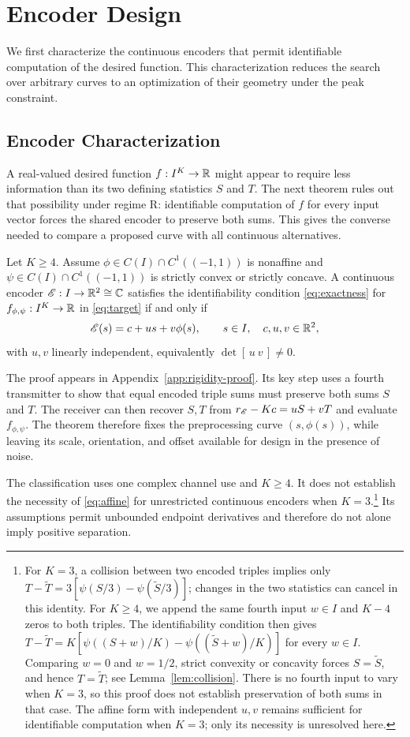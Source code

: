 \section{Encoder Design}\label{sec:design}
We first characterize the continuous encoders that permit identifiable computation of the desired function. This characterization reduces the search over arbitrary curves to an optimization of their geometry under the peak constraint.

\subsection{Encoder Characterization}\label{sec:rigidity}
A real-valued desired function $f:I^K\to\mathbb R$ might appear to require less information than its two defining statistics $S$ and $T$. The next theorem rules out that possibility under regime R: identifiable computation of $f$ for every input vector forces the shared encoder to preserve both sums. This gives the converse needed to compare a proposed curve with all continuous alternatives.

\begin{theorem}
\label{thm:rigidity}
Let $K\ge4$. Assume $\phi\in C(I)\cap C^1((-1,1))$ is nonaffine and $\psi\in C(I)\cap C^1((-1,1))$ is strictly convex or strictly concave. A continuous encoder $\mathscr E:I\to\mathbb R^2\cong\mathbb C$ satisfies the identifiability condition \eqref{eq:exactness} for $f_{\phi,\psi}:I^K\to\mathbb R$ in \eqref{eq:target} if and only if
\begin{equation}
 \mathscr E(s)=c+u s+v\phi(s),
 \qquad s\in I,\quad c,u,v\in\mathbb R^2,
 \label{eq:affine}
\end{equation}
with $u,v$ linearly independent, equivalently $\det[\,u\ v\,]\ne0$.
\end{theorem}
The proof appears in Appendix~\ref{app:rigidity-proof}. Its key step uses a fourth transmitter to show that equal encoded triple sums must preserve both sums $S$ and $T$. The receiver can then recover $S,T$ from $r_\mathscr E-Kc=uS+vT$ and evaluate $f_{\phi,\psi}$. The theorem therefore fixes the preprocessing curve $(s,\phi(s))$, while leaving its scale, orientation, and offset available for design in the presence of noise.

The classification uses one complex channel use and $K\ge4$. It does not establish the necessity of \eqref{eq:affine} for unrestricted continuous encoders when $K=3$.\footnote{For $K=3$, a collision between two encoded triples implies only $T-\widetilde T=3[\psi(S/3)-\psi(\widetilde S/3)]$; changes in the two statistics can cancel in this identity. For $K\ge4$, we append the same fourth input $w\in I$ and $K-4$ zeros to both triples. The identifiability condition then gives $T-\widetilde T=K[\psi((S+w)/K)-\psi((\widetilde S+w)/K)]$ for every $w\in I$. Comparing $w=0$ and $w=1/2$, strict convexity or concavity forces $S=\widetilde S$, and hence $T=\widetilde T$; see Lemma~\ref{lem:collision}. There is no fourth input to vary when $K=3$, so this proof does not establish preservation of both sums in that case. The affine form with independent $u,v$ remains sufficient for identifiable computation when $K=3$; only its necessity is unresolved here.} Its assumptions permit unbounded endpoint derivatives and therefore do not alone imply positive separation.
